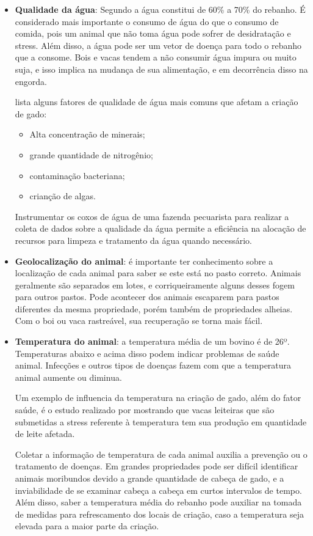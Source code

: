 \documentclass[
    hidelinks,
	12pt,				%
	openany,
	oneside, 
	a4paper,			%
	english,			%
	french,				%
	spanish,			%
	brazil				%
	]{abntex2}
\begin{document}
\begin{itemize}
\item \textbf{Qualidade da água}: Segundo \cite{faries1998water} a água constitui de 60\% a 70\% do rebanho. É considerado mais importante o consumo de água do que o consumo de comida, pois um animal que não toma água pode sofrer de desidratação e stress. Além disso, a água pode ser um vetor de doença para todo o rebanho que a consome. Bois e vacas tendem a não consumir água impura ou muito suja, e isso implica na mudança de sua alimentação, e em decorrência disso na engorda.

\citeauthor{faries1998water} lista alguns fatores de qualidade de água mais comuns que afetam a criação de gado: 
\begin{itemize}
	\item Alta concentração de minerais;
	\item grande quantidade de nitrogênio;
	\item contaminação bacteriana;
	\item crianção de algas.
\end{itemize}

Instrumentar os coxos de água de uma fazenda pecuarista para realizar a coleta de dados sobre a qualidade da água permite a eficiência na alocação de recursos para limpeza e tratamento da água quando necessário. 

\item \textbf{Geolocalização do animal}: é importante ter conhecimento sobre a localização de cada animal para saber se este está no pasto correto. Animais geralmente são separados em lotes, e corriqueiramente alguns desses fogem para outros pastos. Pode acontecer dos animais escaparem para pastos diferentes da mesma propriedade, porém também de propriedades alheias. Com o boi ou vaca rastreável, sua recuperação se torna mais fácil.

\item \textbf{Temperatura do animal}: a temperatura média de um bovino é de 26º. Temperaturas abaixo e acima disso podem indicar problemas de saúde animal. Infecções e outros tipos de doenças fazem com que a temperatura animal aumente ou diminua. 

 Um exemplo de influencia da temperatura na criação de gado, além do fator saúde, é o estudo realizado por \cite{west2003effects} mostrando que vacas leiteiras que são submetidas a stress referente à temperatura tem sua produção em quantidade de leite afetada. 

Coletar a informação de temperatura de cada animal auxilia a prevenção ou o tratamento de doenças. Em grandes propriedades pode ser difícil identificar animais moribundos devido a grande quantidade de cabeça de gado, e a inviabilidade de se examinar cabeça a cabeça em curtos intervalos de tempo. Além disso, saber a temperatura média do rebanho pode auxiliar na tomada de medidas para refrescamento dos locais de criação, caso a temperatura seja elevada para a maior parte da criação.


\end{itemize}
\end{document}
